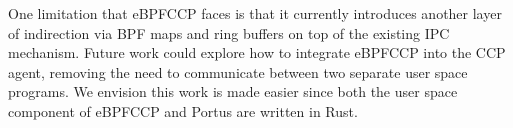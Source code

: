 \documentclass[../main.tex]{subfiles}
\begin{document}
One limitation that eBPFCCP faces is that it currently introduces another layer of indirection via BPF maps and ring buffers on top of the existing IPC mechanism. Future work could explore how to integrate eBPFCCP into the CCP agent, removing the need to communicate between two separate user space programs. We envision this work is made easier since both the user space component of eBPFCCP and Portus are written in Rust.
\end{document}
